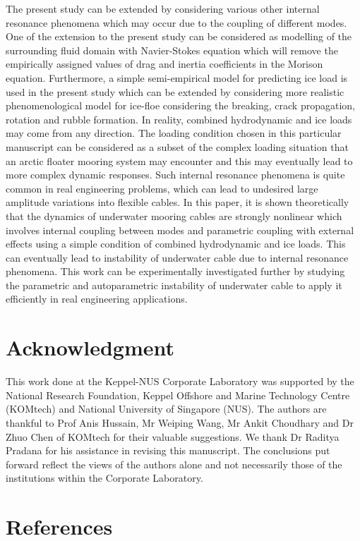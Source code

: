 \documentclass[review]{elsarticle}
\begin{document}
The present study can be extended by considering various other internal resonance phenomena which may occur due to the coupling of different modes. One of the extension to the present study can be considered as modelling of the surrounding fluid domain with Navier-Stokes equation which will remove the empirically assigned values of drag and inertia coefficients in the  Morison equation. Furthermore, a simple semi-empirical model for predicting ice load is used in the present study which can be extended by considering more realistic phenomenological model for ice-floe considering the breaking, crack propagation, rotation and rubble formation. In reality, combined hydrodynamic and ice loads may come from any direction. The loading condition chosen in this particular manuscript can be considered as a subset of the complex loading situation that an arctic floater mooring system may encounter and this may eventually lead to more complex dynamic responses. Such internal resonance phenomena is quite common in real engineering problems, which can lead to undesired large amplitude variations into flexible cables. In this paper, it is shown theoretically that the dynamics of underwater mooring cables are strongly nonlinear which involves internal coupling between modes and parametric coupling with external effects using a simple condition of combined hydrodynamic and ice loads. This can eventually lead to instability of underwater cable due to internal resonance phenomena. This work can be experimentally investigated further by studying the parametric and autoparametric instability of underwater cable to apply it efficiently in real engineering applications. 
\section*{Acknowledgment}
This work done at the Keppel-NUS Corporate Laboratory was supported by the National Research Foundation, Keppel Offshore and Marine Technology Centre (KOMtech) and National University of Singapore (NUS). The authors are thankful to Prof Anis Hussain, Mr Weiping Wang, Mr Ankit Choudhary and Dr Zhuo Chen of KOMtech for their valuable suggestions. We thank Dr Raditya Pradana for his assistance in revising this manuscript. The conclusions put forward reflect the views of the authors alone and not necessarily those of the institutions within the Corporate Laboratory.
\section*{References}

\end{document}
